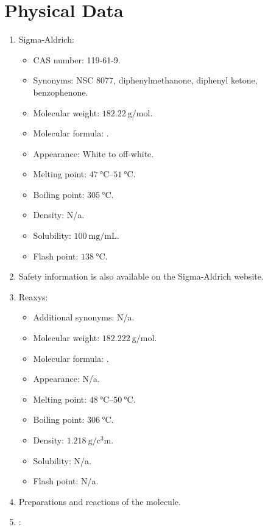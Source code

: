 \documentclass[titlepage]{article}
\begin{document}
\section*{Physical Data}
\begin{enumerate}
    \item Sigma-Aldrich:
    \begin{itemize}
        \item CAS number: 119-61-9.
        \item Synonyms: NSC 8077, diphenylmethanone, diphenyl ketone, benzophenone.
        \item Molecular weight: $\SI[per-mode=symbol]{182.22}{\gram\per\mole}$.
        \item Molecular formula: .
        \item Appearance: White to off-white.
        \item Melting point: $\SIrange{47}{51}{\celsius}$.
        \item Boiling point: $\SI{305}{\celsius}$.
        \item Density: N/a.
        \item Solubility: $\SI[per-mode=symbol]{100}{\milli\gram\per\milli\liter}$.
        \item Flash point: $\SI{138}{\celsius}$.
    \end{itemize}
    \item Safety information is also available on the Sigma-Aldrich website.
    \item Reaxys:
    \begin{itemize}
        \item Additional synonyms: N/a.
        \item Molecular weight: $\SI[per-mode=symbol]{182.222}{\gram\per\mole}$.
        \item Molecular formula: .
        \item Appearance: N/a.
        \item Melting point: $\SIrange{48}{50}{\celsius}$.
        \item Boiling point: $\SI{306}{\celsius}$.
        \item Density: $\SI[per-mode=symbol]{1.218}{\gram\per\cubic\centi\meter}$.
        \item Solubility: N/a.
        \item Flash point: N/a.
    \end{itemize}
    \item Preparations and reactions of the molecule.
    \item \textcite{bib:PubChem-Benzophenone}:

\end{enumerate}
\end{document}
